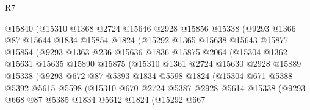 \begin{lexlean}{R7}
\begin{coremodule}
                    @15840
                    (@15310
                      @1368
                      @2724
                      @15646
                      @2928
                      @15856
                      @15338
                      (@9293
                        @1366
                        @87
                        @15644
                        @1834
                        @15854
                        @1824
                        (@15292
                          @1365
                          @15638
                          @15643
                          @15877
                          @15854
                          (@9293
                            @1363
                            @236
                            @15636
                            @1836
                            @15875
                            @2064
                            (@15304
                              @1362
                              @15631
                              @15635
                              @15890
                              @15875
                              (@15310
                                @1361
                                @2724
                                @15630
                                @2928
                                @15889
                                @15338
                                (@9293
                                  @672
                                  @87
                                  @5393
                                  @1834
                                  @5598
                                  @1824
                                  (@15304
                                    @671
                                    @5388
                                    @5392
                                    @5615
                                    @5598
                                    (@15310
                                      @670
                                      @2724
                                      @5387
                                      @2928
                                      @5614
                                      @15338
                                      (@9293
                                        @668
                                        @87
                                        @5385
                                        @1834
                                        @5612
                                        @1824
                                        (@15292
                                          @667

\end{coremodule}
\end{lexlean}

